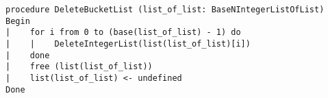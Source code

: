\begin{lstlisting}[breaklines]
procedure DeleteBucketList (list_of_list: BaseNIntegerListOfList)
Begin
|    for i from 0 to (base(list_of_list) - 1) do
|    |    DeleteIntegerList(list(list_of_list)[i])
|    done
|    free (list(list_of_list))
|    list(list_of_list) <- undefined
Done
\end{lstlisting}
